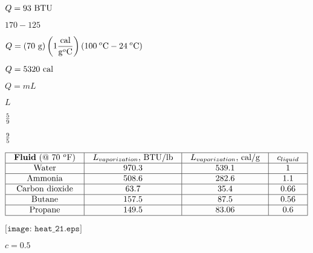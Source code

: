 \documentclass[12pt,a4paper,margin=2cm]{book}
\def\lthtmlcheckvsize{\ifdim\ht\sizebox<\vsize 
  \ifdim\wd\sizebox<\hsize\expandafter\hfill\fi \expandafter\vfill
  \else\expandafter\vss\fi}%
\begin{document}
{\newpage\clearpage
{}%
$\displaystyle Q = 93 \hbox{ BTU}$%
\lthtmlindisplaymathZ
\lthtmlcheckvsize\clearpage}

{\newpage\clearpage
{}%
$ 170-125$%
\lthtmlindisplaymathZ
\lthtmlcheckvsize\clearpage}

{\newpage\clearpage
{}%
$\displaystyle Q = (70 \hbox{ g})\left(1 {\hbox{cal} \over {\hbox{g}^o\hbox{C}}}\right)(100 \> ^o\hbox{C} - 24 \> ^o\hbox{C})$%
\lthtmlindisplaymathZ
\lthtmlcheckvsize\clearpage}

{\newpage\clearpage
{}%
$\displaystyle Q = 5320 \hbox{ cal}$%
\lthtmlindisplaymathZ
\lthtmlcheckvsize\clearpage}

{\newpage\clearpage
{}%
$\displaystyle Q = mL$%
\lthtmlindisplaymathZ
\lthtmlcheckvsize\clearpage}

{\newpage\clearpage
{}%
$ L$%
\lthtmlindisplaymathZ
\lthtmlcheckvsize\clearpage}

{\newpage\clearpage
{}%
$ 5 \over 9$%
\lthtmlindisplaymathZ
\lthtmlcheckvsize\clearpage}

{\newpage\clearpage
{}%
$ 9 \over 5$%
\lthtmlindisplaymathZ
\lthtmlcheckvsize\clearpage}

{\newpage\clearpage
{}%
$\displaystyle \vbox{\offinterlineskip
\halign{\strut
\vrule \quad\hfil # \  \hfil & 
\vrule \quad\hfil # \  \hfil & 
\vrule \quad\hfil # \  \hfil & 
\vrule \quad\hfil # \  \hfil \vrule \cr
\noalign{\hrule }
\textbf{Fluid} (@ 70 $^{o}$F) & $L_{vaporization}$, BTU/lb & $L_{vaporization}$, cal/g & $c_{liquid}$ \cr
\noalign{\hrule }
Water & 970.3 & 539.1 & 1 \cr
\noalign{\hrule }
Ammonia & 508.6 & 282.6 & 1.1 \cr
\noalign{\hrule }
Carbon dioxide & 63.7 & 35.4 & 0.66 \cr
\noalign{\hrule }
Butane & 157.5 & 87.5 & 0.56 \cr
\noalign{\hrule }
Propane & 149.5 & 83.06 & 0.6 \cr
\noalign{\hrule }
} %
}$%
\lthtmlindisplaymathZ
\lthtmlcheckvsize\clearpage}

{\newpage\clearpage
{}%
$\displaystyle \texttt{[image: heat\_21.eps]}$%
\lthtmlindisplaymathZ
\lthtmlcheckvsize\clearpage}

{\newpage\clearpage
{}%
$ c = 0.5$%
\lthtmlindisplaymathZ
\lthtmlcheckvsize\clearpage}
\end{document}
